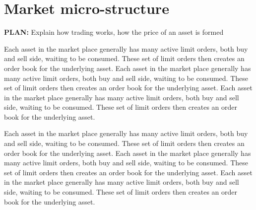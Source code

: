 \documentclass{tut-thesis}
\begin{document}

\section{Market micro-structure}
\textbf{PLAN:} Explain how trading works, how the price of an asset is formed

Each asset in the market place generally has many active limit orders, both buy and sell side, waiting to be consumed. These set of limit orders then creates an order book for the underlying asset. Each asset in the market place generally has many active limit orders, both buy and sell side, waiting to be consumed. These set of limit orders then creates an order book for the underlying asset. Each asset in the market place generally has many active limit orders, both buy and sell side, waiting to be consumed. These set of limit orders then creates an order book for the underlying asset.


Each asset in the market place generally has many active limit orders, both buy and sell side, waiting to be consumed. These set of limit orders then creates an order book for the underlying asset. Each asset in the market place generally has many active limit orders, both buy and sell side, waiting to be consumed. These set of limit orders then creates an order book for the underlying asset. Each asset in the market place generally has many active limit orders, both buy and sell side, waiting to be consumed. These set of limit orders then creates an order book for the underlying asset.
\end{document}
